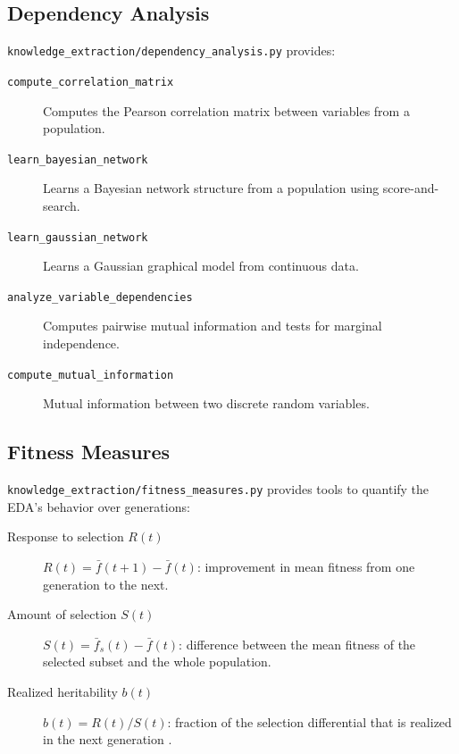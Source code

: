 \documentclass[a4paper,11pt]{article}
\begin{document}
\subsection{Dependency Analysis}

\texttt{knowledge\_extraction/dependency\_analysis.py} provides:

\begin{description}
  \item[\texttt{compute\_correlation\_matrix}]
    Computes the Pearson correlation matrix between variables from a population.

  \item[\texttt{learn\_bayesian\_network}]
    Learns a Bayesian network structure from a population using score-and-search.

  \item[\texttt{learn\_gaussian\_network}]
    Learns a Gaussian graphical model from continuous data.

  \item[\texttt{analyze\_variable\_dependencies}]
    Computes pairwise mutual information and tests for marginal independence.

  \item[\texttt{compute\_mutual\_information}]
    Mutual information between two discrete random variables.
\end{description}

\subsection{Fitness Measures}

\texttt{knowledge\_extraction/fitness\_measures.py} provides tools to
quantify the EDA's behavior over generations:

\begin{description}
  \item[Response to selection $R(t)$]
    $R(t) = \bar{f}(t+1) - \bar{f}(t)$: improvement in mean fitness
    from one generation to the next.

  \item[Amount of selection $S(t)$]
    $S(t) = \bar{f}_s(t) - \bar{f}(t)$: difference between the mean
    fitness of the selected subset and the whole population.

  \item[Realized heritability $b(t)$]
    $b(t) = R(t) / S(t)$: fraction of the selection differential that
    is realized in the next generation \citep{Muhlenbein:1997}.
\end{description}
\end{document}
